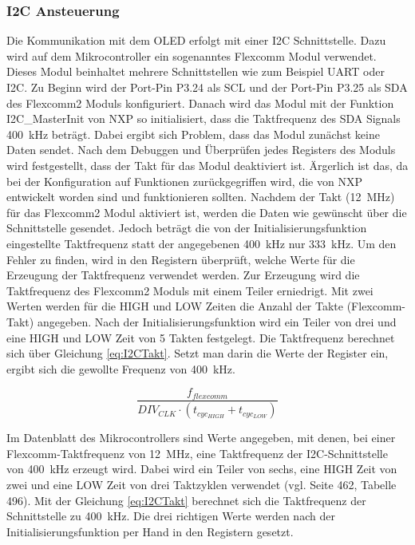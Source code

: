 \subsubsection{I2C Ansteuerung}\label{sec:OLEDI2C}

Die Kommunikation mit dem \ac{OLED} erfolgt mit einer \ac{I2C} Schnittstelle. Dazu wird auf dem Mikrocontroller ein sogenanntes Flexcomm Modul verwendet. Dieses Modul beinhaltet mehrere Schnittstellen wie zum Beispiel \ac{UART} oder \ac{I2C}. Zu Beginn wird der Port-Pin P3.24 als SCL und der Port-Pin P3.25 als SDA des Flexcomm2 Moduls konfiguriert. Danach wird das Modul mit der Funktion \glqq I2C\_MasterInit\grqq{} von NXP so initialisiert, dass die Taktfrequenz des SDA Signals \SI{400}{\kilo\hertz} beträgt. Dabei ergibt sich Problem, dass das Modul zunächst keine Daten sendet. Nach dem Debuggen und Überprüfen jedes Registers des Moduls wird festgestellt, dass der Takt für das Modul deaktiviert ist. Ärgerlich ist das, da bei der Konfiguration auf Funktionen zurückgegriffen wird, die von NXP entwickelt worden sind und funktionieren sollten. Nachdem der Takt (\SI{12}{\mega\hertz}) für das Flexcomm2 Modul aktiviert ist, werden die Daten wie gewünscht über die Schnittstelle gesendet. Jedoch beträgt die von der Initialisierungsfunktion eingestellte Taktfrequenz statt der angegebenen \SI{400}{\kilo\hertz} nur \SI{333}{\kilo\hertz}. Um den Fehler zu finden, wird in den Registern überprüft, welche Werte für die Erzeugung der Taktfrequenz verwendet werden. Zur Erzeugung wird die Taktfrequenz des Flexcomm2 Moduls mit einem Teiler erniedrigt. Mit zwei Werten werden für die HIGH und LOW Zeiten die Anzahl der Takte (Flexcomm-Takt) angegeben. Nach der Initialisierungsfunktion wird ein Teiler von drei und eine HIGH und LOW Zeit von 5 Takten festgelegt. Die Taktfrequenz berechnet sich über Gleichung \ref{eq:I2CTakt}. Setzt man darin die Werte der Register ein, ergibt sich die gewollte Frequenz von \SI{400}{\kilo\hertz}.

\begin{equation}\label{eq:I2CTakt}
\frac{f_{flexcomm}}{DIV_{CLK}\cdot\left(t_{cyc_{HIGH}}+t_{cyc_{LOW}}\right)}
\end{equation}

Im Datenblatt des Mikrocontrollers sind Werte angegeben, mit denen, bei einer Flexcomm-Taktfrequenz von \SI{12}{\mega\hertz}, eine Taktfrequenz der \ac{I2C}-Schnittstelle von \SI{400}{\kilo\hertz} erzeugt wird. Dabei wird ein Teiler von sechs, eine HIGH Zeit von zwei und eine LOW Zeit von drei Taktzyklen verwendet (vgl. \cite{Semic} Seite 462, Tabelle 496). Mit der Gleichung \ref{eq:I2CTakt} berechnet sich die Taktfrequenz der Schnittstelle zu \SI{400}{\kilo\hertz}. Die drei richtigen Werte werden nach der Initialisierungsfunktion per Hand in den Registern gesetzt.\vspace{11pt}

